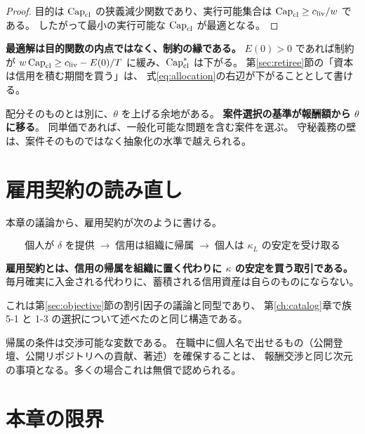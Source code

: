\begin{proof}
目的は $\mathrm{Cap}_{\mathrm{cl}}$ の狭義減少関数であり、実行可能集合は $\mathrm{Cap}_{\mathrm{cl}}\geq c_{\rm liv}/w$ である。
したがって最小の実行可能な $\mathrm{Cap}_{\mathrm{cl}}$ が最適となる。
\end{proof}

\textbf{最適解は目的関数の内点ではなく、制約の縁である。}
$E(0)>0$ であれば制約が $w\,\mathrm{Cap}_{\mathrm{cl}}\geq c_{\rm liv} - E(0)/T$ に緩み、$\mathrm{Cap}_{\mathrm{cl}}^\ast$ は下がる。
第\ref{sec:retiree}節の「資本は信用を積む期間を買う」は、
式\eqref{eq:allocation}の右辺が下がることとして書ける。

配分そのものとは別に、$\theta$ を上げる余地がある。
\textbf{案件選択の基準が報酬額から $\theta$ に移る}。
同単価であれば、一般化可能な問題を含む案件を選ぶ。
守秘義務の壁は、案件そのものではなく抽象化の水準で越えられる。

\section{雇用契約の読み直し}

本章の議論から、雇用契約が次のように書ける。

\begin{equation}
\text{個人が $\delta$ を提供} \;\to\; \text{信用は組織に帰属}
\;\to\; \text{個人は $\kappa_L$ の安定を受け取る}
\end{equation}

\textbf{雇用契約とは、信用の帰属を組織に置く代わりに $\kappa$ の安定を買う取引である。}
毎月確実に入金される代わりに、蓄積される信用資産は自らのものにならない。

これは第\ref{sec:objective}節の割引因子の議論と同型であり、
第\ref{ch:catalog}章で族5-1 と 1-3 の選択について述べたのと同じ構造である。

帰属の条件は交渉可能な変数である。
在職中に個人名で出せるもの（公開登壇、公開リポジトリへの貢献、著述）を確保することは、
報酬交渉と同じ次元の事項となる。多くの場合これは無償で認められる。

\section{本章の限界}

